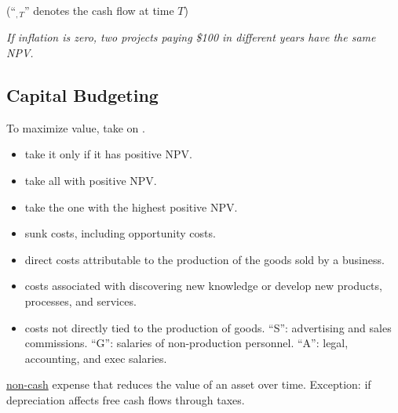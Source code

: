 

(``$_{,T}$'' denotes the cash flow at time $T$)

\textit{If inflation is zero, two projects paying \$100 in different years have the same NPV.}

\subsection{Capital Budgeting}

To maximize value, take on .
\begin{itemize}
    \item {} take it only if it has positive NPV.
    \item {} take all with positive NPV.
    \item {} take the one with the highest positive NPV.
    \item {} sunk costs, including opportunity costs.
\end{itemize}

\begin{itemize}
    \item {} direct costs attributable to the production of the goods sold by a business.
    \item {} costs associated with discovering new knowledge or develop new products, processes, and services.
    \item {} costs not directly tied to the production of goods. \eg ``S'': advertising and sales commissions. ``G'': salaries of non-production personnel. ``A'': legal, accounting, and exec salaries.
\end{itemize}

 \underline{non-cash} expense that reduces the value of an asset over time.  Exception: if depreciation
affects free cash flows through taxes.

